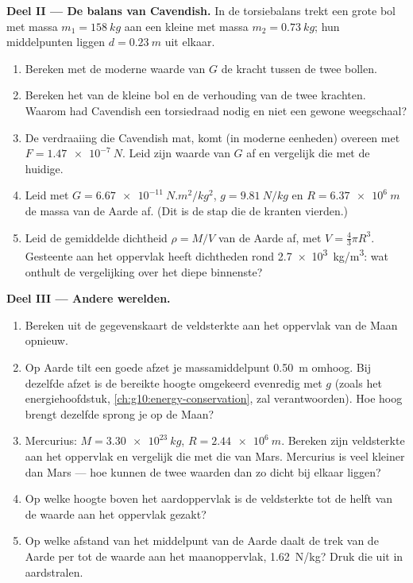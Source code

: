 \begin{problem}
\medskip
\noindent\textbf{Deel II --- De balans van Cavendish.}
In de torsiebalans trekt een grote bol met massa $m_1 = \qty{158}{kg}$
aan een kleine met massa $m_2 = \qty{0.73}{kg}$; hun middelpunten liggen
$d = \qty{0.23}{m}$ uit elkaar.
\begin{enumerate}[resume]
  \item Bereken met de moderne waarde van $G$ de kracht tussen de twee
        bollen.
  \item Bereken het  van de kleine bol en de verhouding van de
        twee krachten. Waarom had Cavendish een torsiedraad nodig en niet
        een gewone weegschaal?
  \item De verdraaiing die Cavendish mat, komt (in moderne eenheden)
        overeen met $F = \qty{1.47e-7}{N}$. Leid zijn waarde van $G$ af
        en vergelijk die met de huidige.
  \item Leid met $G = \qty{6.67e-11}{N.m^2/kg^2}$, $g = \qty{9.81}{N/kg}$
        en $R = \qty{6.37e6}{m}$ de massa van de Aarde af. (Dit is de
        stap die de kranten vierden.)
  \item Leid de gemiddelde dichtheid $\rho = M / V$ van de Aarde af, met
        $V = \frac43 \pi R^3$. Gesteente aan het oppervlak heeft
        dichtheden rond \qty{2.7e3}{kg/m^3}: wat onthult de vergelijking
        over het diepe binnenste?
\end{enumerate}

\medskip
\noindent\textbf{Deel III --- Andere werelden.}
\begin{enumerate}[resume]
  \item Bereken uit de gegevenskaart de veldsterkte aan het oppervlak van
        de Maan opnieuw.
  \item Op Aarde tilt een goede afzet je massamiddelpunt \qty{0.50}{m}
        omhoog. Bij dezelfde afzet is de bereikte hoogte omgekeerd
        evenredig met $g$ (zoals het energiehoofdstuk,
        \cref{ch:g10:energy-conservation}, zal verantwoorden). Hoe hoog
        brengt dezelfde sprong je op de Maan?
  \item Mercurius: $M = \qty{3.30e23}{kg}$, $R = \qty{2.44e6}{m}$.
        Bereken zijn veldsterkte aan het oppervlak en vergelijk die met
        die van Mars. Mercurius is veel kleiner dan Mars --- hoe kunnen
        de twee waarden dan zo dicht bij elkaar liggen?
  \item Op welke hoogte boven het aardoppervlak is de veldsterkte tot de
        helft van de waarde aan het oppervlak gezakt?
  \item Op welke afstand van het middelpunt van de Aarde daalt de trek
        van de Aarde per  tot de waarde aan het maanoppervlak,
        \qty{1.62}{N/kg}? Druk die uit in aardstralen.
\end{enumerate}


\end{problem}
